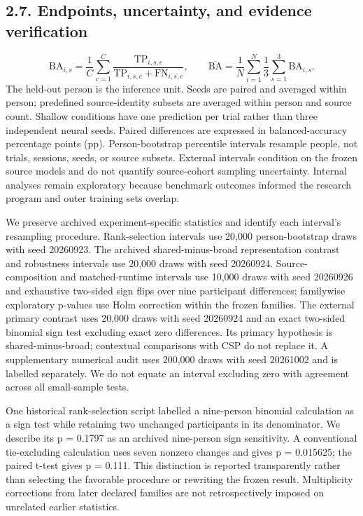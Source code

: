 \documentclass[11pt]{article}
\begin{document}
\subsection*{2.7. Endpoints, uncertainty, and evidence verification}
\begin{equation*}
\mathrm{BA}_{i,s}=\frac{1}{C}\sum_{c=1}^{C}\frac{\mathrm{TP}_{i,s,c}}{\mathrm{TP}_{i,s,c}+\mathrm{FN}_{i,s,c}},\qquad\overline{\mathrm{BA}}=\frac{1}{N}\sum_{i=1}^{N}\frac{1}{3}\sum_{s=1}^{3}\mathrm{BA}_{i,s}.
\end{equation*}
The held-out person is the inference unit. Seeds are paired and averaged within person; predefined source-identity subsets are averaged within person and source count. Shallow conditions have one prediction per trial rather than three independent neural seeds. Paired differences are expressed in balanced-accuracy percentage points (pp). Person-bootstrap percentile intervals resample people, not trials, sessions, seeds, or source subsets. External intervals condition on the frozen source models and do not quantify source-cohort sampling uncertainty. Internal analyses remain exploratory because benchmark outcomes informed the research program and outer training sets overlap.

We preserve archived experiment-specific statistics and identify each interval's resampling procedure. Rank-selection intervals use 20,000 person-bootstrap draws with seed 20260923. The archived shared-minus-broad representation contrast and robustness intervals use 20,000 draws with seed 20260924. Source-composition and matched-runtime intervals use 10,000 draws with seed 20260926 and exhaustive two-sided sign flips over nine participant differences; familywise exploratory p-values use Holm correction within the frozen families. The external primary contrast uses 20,000 draws with seed 20260924 and an exact two-sided binomial sign test excluding exact zero differences. Its primary hypothesis is shared-minus-broad; contextual comparisons with CSP do not replace it. A supplementary numerical audit uses 200,000 draws with seed 20261002 and is labelled separately. We do not equate an interval excluding zero with agreement across all small-sample tests.

One historical rank-selection script labelled a nine-person binomial calculation as a sign test while retaining two unchanged participants in its denominator. We describe its p = 0.1797 as an archived nine-person sign sensitivity. A conventional tie-excluding calculation uses seven nonzero changes and gives p = 0.015625; the paired t-test gives p = 0.111. This distinction is reported transparently rather than selecting the favorable procedure or rewriting the frozen result. Multiplicity corrections from later declared families are not retrospectively imposed on unrelated earlier statistics.
\end{document}
